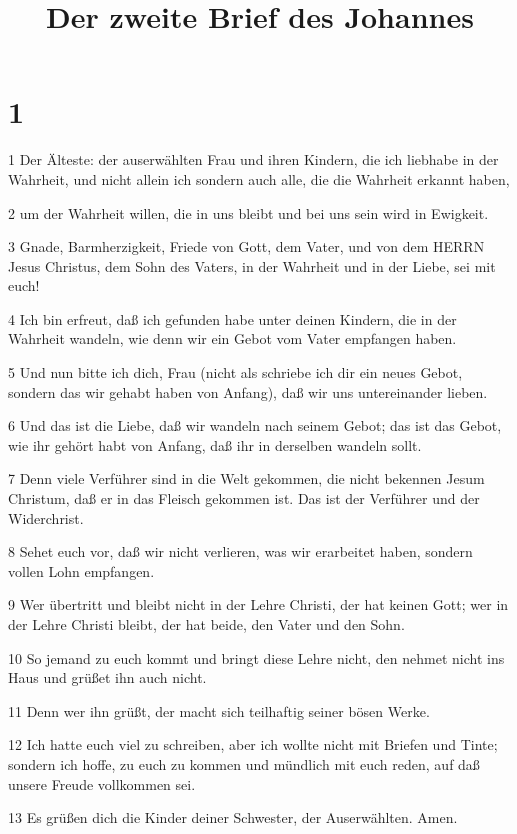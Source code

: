 

\title{Der zweite Brief des Johannes}


\chapter{1}

\par 1 Der Älteste: der auserwählten Frau und ihren Kindern, die ich liebhabe in der Wahrheit, und nicht allein ich sondern auch alle, die die Wahrheit erkannt haben,
\par 2 um der Wahrheit willen, die in uns bleibt und bei uns sein wird in Ewigkeit.
\par 3 Gnade, Barmherzigkeit, Friede von Gott, dem Vater, und von dem HERRN Jesus Christus, dem Sohn des Vaters, in der Wahrheit und in der Liebe, sei mit euch!
\par 4 Ich bin erfreut, daß ich gefunden habe unter deinen Kindern, die in der Wahrheit wandeln, wie denn wir ein Gebot vom Vater empfangen haben.
\par 5 Und nun bitte ich dich, Frau (nicht als schriebe ich dir ein neues Gebot, sondern das wir gehabt haben von Anfang), daß wir uns untereinander lieben.
\par 6 Und das ist die Liebe, daß wir wandeln nach seinem Gebot; das ist das Gebot, wie ihr gehört habt von Anfang, daß ihr in derselben wandeln sollt.
\par 7 Denn viele Verführer sind in die Welt gekommen, die nicht bekennen Jesum Christum, daß er in das Fleisch gekommen ist. Das ist der Verführer und der Widerchrist.
\par 8 Sehet euch vor, daß wir nicht verlieren, was wir erarbeitet haben, sondern vollen Lohn empfangen.
\par 9 Wer übertritt und bleibt nicht in der Lehre Christi, der hat keinen Gott; wer in der Lehre Christi bleibt, der hat beide, den Vater und den Sohn.
\par 10 So jemand zu euch kommt und bringt diese Lehre nicht, den nehmet nicht ins Haus und grüßet ihn auch nicht.
\par 11 Denn wer ihn grüßt, der macht sich teilhaftig seiner bösen Werke.
\par 12 Ich hatte euch viel zu schreiben, aber ich wollte nicht mit Briefen und Tinte; sondern ich hoffe, zu euch zu kommen und mündlich mit euch reden, auf daß unsere Freude vollkommen sei.
\par 13 Es grüßen dich die Kinder deiner Schwester, der Auserwählten. Amen.



